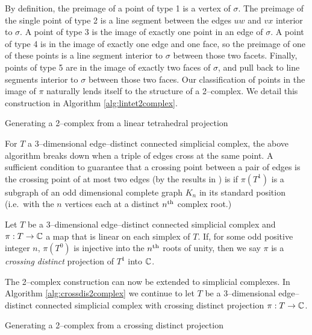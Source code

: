 By definition, the preimage of a point of type 1 is a vertex of $\sigma$.
The preimage of the single point of type 2 is a line segment between the edges $uw$ and $vx$ interior to $\sigma$.
A point of type 3 is the image of exactly one point in an edge of $\sigma$.
A point of type 4 is in the image of exactly one edge and one face, so the preimage of one of these points is a line segment interior to $\sigma$ between those two facets.
Finally, points of type 5 are in the image of exactly two faces of $\sigma$, and pull back to line segments interior to $\sigma$ between those two faces.
Our classification of points in the image of $\pi$ naturally lends itself to the structure of a 2--complex.
We detail this construction in Algorithm \ref{alg:lintet2complex}.

\begin{algorithm}[h]
	\caption{Generating a 2--complex from a linear tetrahedral projection}
	\label{alg:lintet2complex}
\end{algorithm}

For $T$ a 3--dimensional edge--distinct connected simplicial complex, the above algorithm breaks down when a triple of edges cross at the same point.
A sufficient condition to guarantee that a crossing point between a pair of edges is the crossing point of at most two edges (by the results in \cite{PoonRub98}) is if $\pi(T^1)$ is a subgraph of an odd dimensional complete graph $K_n$ in its standard position (i.e.\ with the $n$ vertices each at a distinct $n^{\text{th}}$ complex root.)

\begin{defn}
	Let $T$ be a 3--dimensional edge--distinct connected simplicial complex and $\pi:T\to\mathbb{C}$ a map that is linear on each simplex of $T$.
	If, for some odd positive integer $n$, $\pi(T^0)$ is injective into the $n^{\text{th}}$ roots of unity, then we say $\pi$ is a \emph{crossing distinct} projection of $T^1$ into $\mathbb{C}$.
\end{defn}

The 2--complex construction can now be extended to simplicial complexes.
In Algorithm \ref{alg:crossdis2complex} we continue to let $T$ be a 3--dimensional edge--distinct connected simplicial complex with crossing distinct projection $\pi:T\to\mathbb{C}$.

\begin{algorithm}[h]
	\caption{Generating a 2--complex from a crossing distinct projection}
	\label{alg:crossdis2complex}
\end{algorithm}